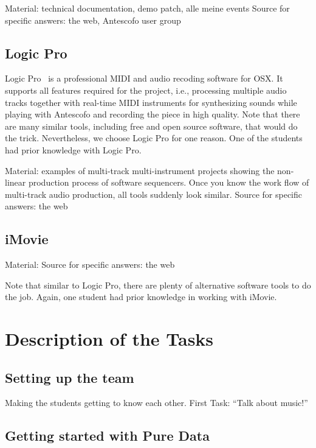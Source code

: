 \documentclass[onecolumn,nocopyrightspace,preprint]{sigplanconf}
\begin{document}
Material: technical documentation, demo patch, alle meine events
Source for specific answers: the web, Antescofo user group

\subsection{Logic Pro}

Logic Pro~\cite{website:logic} is a professional MIDI and audio recoding
software for OSX. It supports all features required for the project, i.e.,
processing multiple audio tracks together with real-time MIDI instruments for
synthesizing sounds while playing with Antescofo and recording the piece in
high quality.  Note that there are many similar tools, including free and open
source software, that would do the trick. Nevertheless, we choose Logic Pro
for one reason. One of the students had prior knowledge with Logic Pro.


Material: examples of multi-track multi-instrument projects showing
the non-linear production process of software sequencers. Once you know
the work flow of multi-track audio production, all tools suddenly look similar.
Source for specific answers: the web

\subsection{iMovie}

Material: 
Source for specific answers: the web


Note that similar to Logic Pro, there are plenty of alternative software
tools to do the job. Again, one student had prior knowledge in working
with iMovie. 


\section{Description of the Tasks}

\subsection{Setting up the team}

Making the students getting to know each other. First Task: ``Talk about music!''

\subsection{Getting started with Pure Data}
\end{document}

